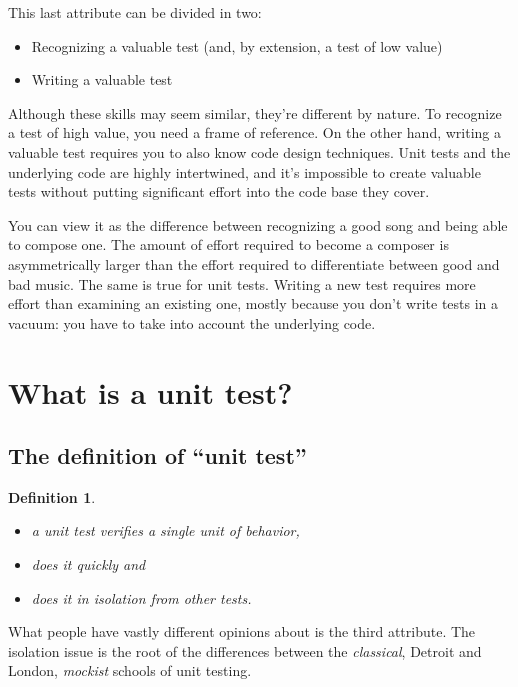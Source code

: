 \documentclass{article}
\newtheorem{definition}{Definition}
\begin{document}
This last attribute can be divided in two:
\begin{itemize}
	\item Recognizing a valuable test (and, by extension, a test of low value)
	\item Writing a valuable test
\end{itemize}

Although these skills may seem similar, they’re different by nature. To recognize a test of high value, you need a frame of reference. On the other hand, writing a valuable test requires you to also know code design techniques. Unit tests and the underlying code are highly intertwined, and it’s impossible to create valuable tests without putting significant effort into the code base they cover. 

You can view it as the difference between recognizing a good song and being able to compose one. The amount of effort required to become a composer is asymmetrically larger than the effort required to differentiate between good and bad music. The same is true for unit tests. Writing a new test requires more effort than examining an existing one, mostly because you don’t write tests in a vacuum: you have to take into account the underlying code.

\section{What is a unit test?}

\subsection{The definition of “unit test”}

\begin{definition}
\begin{itemize}
Unit tests are automatic tests having the following properties:
	\item a unit test verifies a single unit of behavior,
	\item does it quickly and
	\item does it in isolation from other tests.
\end{itemize}
\end{definition}

What people have vastly different opinions about is the third attribute. The isolation issue is the root of the differences between the \textit{classical}, Detroit and London, \textit{mockist} schools of
unit testing.
\end{document}
